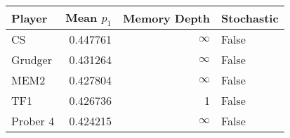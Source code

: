 \begin{tabular}{lrrl}
\toprule
   Player &  Mean $p_1$ &  Memory Depth & Stochastic \\
\midrule
       CS &    0.447761 &            \(\infty\) &      False \\
  Grudger &    0.431264 &            \(\infty\) &      False \\
     MEM2 &    0.427804 &            \(\infty\) &      False \\
      TF1 &    0.426736 &             1 &      False \\
 Prober 4 &    0.424215 &            \(\infty\) &      False \\
\bottomrule
\end{tabular}
